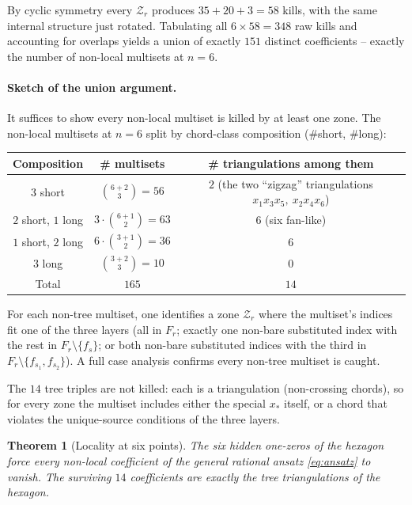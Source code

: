 \documentclass[11pt]{article}
\newtheorem{theorem}{Theorem}
\newcommand{\Zr}{\mathcal{Z}}
\newcommand{\Fr}{F}
\begin{document}
By cyclic symmetry every $\Zr_r$ produces $35 + 20 + 3 = 58$ kills,
with the same internal structure just rotated. Tabulating all
$6 \times 58 = 348$ raw kills and accounting for overlaps yields a
union of exactly $151$ distinct coefficients -- exactly the number of
non-local multisets at $n = 6$.

\paragraph{Sketch of the union argument.}
It suffices to show every non-local multiset is killed by at least one
zone. The non-local multisets at $n=6$ split by chord-class composition
(\#short, \#long):
\begin{center}
\begin{tabular}{c|cc}
Composition & \# multisets & \# triangulations among them \\ \hline
$3$ short & $\binom{6+2}{3} = 56$ & $2$ (the two ``zigzag'' triangulations $x_1 x_3 x_5,\ x_2 x_4 x_6$)\\
$2$ short, $1$ long & $3 \cdot \binom{6+1}{2} = 63$ & $6$ (six fan-like)\\
$1$ short, $2$ long & $6 \cdot \binom{3+1}{2} = 36$ & $6$\\
$3$ long & $\binom{3+2}{3} = 10$ & $0$\\ \hline
Total & $165$ & $14$
\end{tabular}
\end{center}

For each non-tree multiset, one identifies a zone $\Zr_r$ where the
multiset's indices fit one of the three layers (all in $\Fr_r$;
exactly one non-bare substituted index with the rest in
$\Fr_r \setminus \{f_s\}$; or both non-bare substituted indices with
the third in $\Fr_r \setminus \{f_{s_1}, f_{s_2}\}$). A full case analysis
confirms every non-tree multiset is caught.

The $14$ tree triples are not killed: each is a triangulation
(non-crossing chords), so for every zone the multiset includes either
the special $x_\ast$ itself, or a chord that violates the unique-source
conditions of the three layers.

\begin{theorem}[Locality at six points]\label{thm:loc6}
The six hidden one-zeros of the hexagon force every non-local
coefficient of the general rational ansatz \eqref{eq:ansatz} to vanish.
The surviving $14$ coefficients are exactly the tree triangulations of
the hexagon.
\end{theorem}
\end{document}
